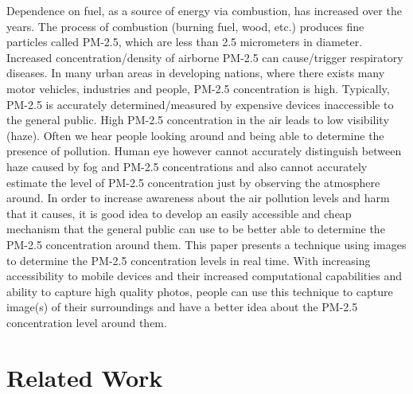 \documentclass{article}
\begin{document}
Dependence on fuel, as a source of energy via combustion, has increased over the years. The process of combustion (burning fuel, wood, etc.) produces fine particles called PM-2.5, which are less than 2.5 micrometers in diameter. Increased concentration/density of airborne PM-2.5 can cause/trigger respiratory diseases. In many urban areas in developing nations, where there exists many motor vehicles, industries and people, PM-2.5 concentration is high. Typically, PM-2.5 is accurately determined/measured by expensive devices inaccessible to the general public. High PM-2.5 concentration in the air leads to low visibility (haze). Often we hear people looking around and being able to determine the presence of pollution. Human eye however cannot accurately distinguish between haze caused by fog and PM-2.5 concentrations  and also cannot accurately estimate the level of  PM-2.5 concentration just by observing the atmosphere around. In order to increase awareness about the air pollution levels and harm that it causes, it is good idea to develop an easily accessible and cheap mechanism that the general public can use to be better able to determine the PM-2.5 concentration around them. This paper presents a technique using images to determine the PM-2.5 concentration levels in real time. With increasing accessibility to mobile devices and their increased computational capabilities and ability to capture high quality photos, people can use this technique to capture image(s) of their surroundings and have a better idea about the PM-2.5 concentration level around them.

\section{Related Work}
\label{sec:related work}
\end{document}
